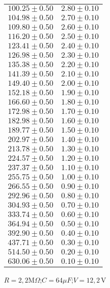 \documentclass[12pt, letterpaper]{article} %
\theoremstyle{plain} %
\begin{document}
\begin{figure}[H]
\begin{minipage}[t]{0.48\textwidth}
\begin{minipage}[t]{\linewidth}
\begin{tabular}{|c|c|}
$100.25 \pm 0.50$ & $2.80 \pm 0.10$ \\
$104.98 \pm 0.50$ & $2.70 \pm 0.10$ \\
$109.80 \pm 0.50$ & $2.60 \pm 0.10$ \\
$116.20 \pm 0.50$ & $2.50 \pm 0.10$ \\
$123.41 \pm 0.50$ & $2.40 \pm 0.10$ \\
$126.98 \pm 0.50$ & $2.30 \pm 0.10$ \\
$135.38 \pm 0.50$ & $2.20 \pm 0.10$ \\
$141.39 \pm 0.50$ & $2.10 \pm 0.10$ \\
$149.40 \pm 0.50$ & $2.00 \pm 0.10$ \\
$152.18 \pm 0.50$ & $1.90 \pm 0.10$ \\
$166.60 \pm 0.50$ & $1.80 \pm 0.10$ \\
$172.98 \pm 0.50$ & $1.70 \pm 0.10$ \\
$182.98 \pm 0.50$ & $1.60 \pm 0.10$ \\
$189.77 \pm 0.50$ & $1.50 \pm 0.10$ \\
$202.97 \pm 0.50$ & $1.40 \pm 0.10$ \\
$213.78 \pm 0.50$ & $1.30 \pm 0.10$ \\
$224.57 \pm 0.50$ & $1.20 \pm 0.10$ \\
$237.37 \pm 0.50$ & $1.10 \pm 0.10$ \\
$255.75 \pm 0.50$ & $1.00 \pm 0.10$ \\
$266.55 \pm 0.50$ & $0.90 \pm 0.10$ \\
$292.96 \pm 0.50$ & $0.80 \pm 0.10$ \\
$304.93 \pm 0.50$ & $0.70 \pm 0.10$ \\
$333.74 \pm 0.50$ & $0.60 \pm 0.10$ \\
$364.94 \pm 0.50$ & $0.50 \pm 0.10$ \\
$392.90 \pm 0.50$ & $0.40 \pm 0.10$ \\
$437.71 \pm 0.50$ & $0.30 \pm 0.10$ \\
$514.50 \pm 0.50$ & $0.20 \pm 0.10$ \\
$630.06 \pm 0.50$ & $0.10 \pm 0.10$ \\
\hline
\end{tabular}
\caption*{$R = 2,2 \text{M}\Omega$;$C = 64 \mu F$;$V = 12,2$\,V}
\end{minipage}


\end{minipage}
\end{figure}
\end{document}
